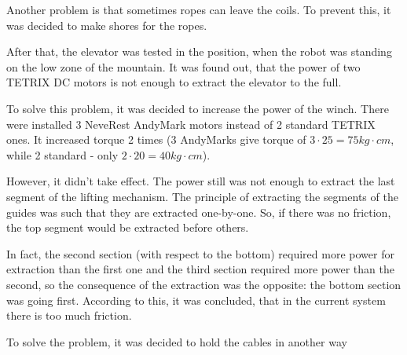\begin{enumerate*}
\begin{enumerate*}
  	\item Another problem is that sometimes ropes can leave the coils. To prevent this, it was decided to make shores for the ropes.
  	
  \end{enumerate*}

  \item After that, the elevator was tested in the position, when the robot was standing on the low zone of the mountain. It was found out, that the power of two TETRIX DC motors is not enough to extract the elevator to the full.

  To solve this problem, it was decided to increase the power of the winch. There were installed 3 NeveRest AndyMark motors instead of 2 standard TETRIX ones. %
  It increased torque 2 times (3 AndyMarks give torque of $3 \cdot 25 = 75kg \cdot cm$, while 2 standard - only $2 \cdot 20 = 40kg \cdot cm$).
  

  However, it didn't take effect. The power still was not enough to extract the last segment of the lifting mechanism. The principle of extracting the segments of the guides was such that they are extracted one-by-one. So, if there was no friction, the top segment would be extracted before others.

  In fact, the second section (with respect to the bottom) required more power for extraction than the first one and the third section required more power than the second, so the consequence of the extraction was the opposite: the bottom section was going first. According to this, it was concluded, that in the current system there is too much friction.

  To solve the problem, it was decided to hold the cables in another way %



\end{enumerate*}
